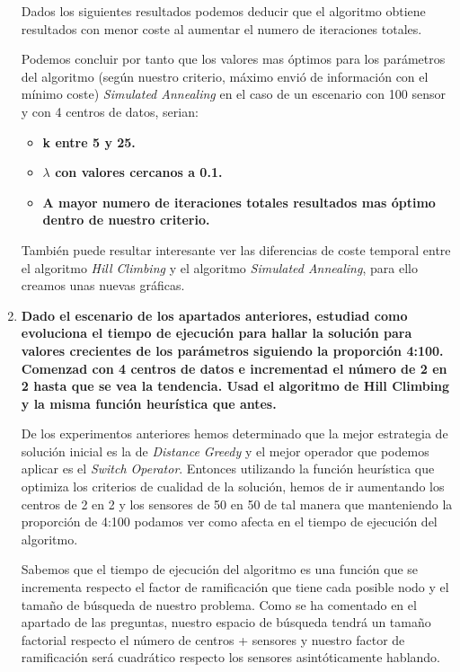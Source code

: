 \documentclass{article}
\begin{document}
\begin{enumerate}
 Dados los siguientes resultados podemos deducir que el algoritmo obtiene resultados con menor coste al aumentar el numero de iteraciones totales.

 Podemos concluir por tanto que los valores mas óptimos para los parámetros del algoritmo (según nuestro criterio, máximo envió de información con el mínimo coste) \textit{Simulated Annealing} en el caso de un escenario con 100 sensor y con 4 centros de datos, serian:

  \begin{itemize}
    \item \textbf{k entre 5 y 25.}
    \item \textbf{${\lambda}$ con valores cercanos a 0.1.}
    \item \textbf{A mayor numero de iteraciones totales resultados mas óptimo dentro de nuestro criterio.}
  \end{itemize}

  También puede resultar interesante ver las diferencias de coste temporal entre el algoritmo \textit{Hill Climbing} y el algoritmo  \textit{Simulated Annealing}, para ello creamos unas nuevas gráficas.


  \item \textbf{Dado el escenario de los apartados anteriores, estudiad como evoluciona el tiempo de ejecución para hallar la solución para valores crecientes de los parámetros siguiendo la proporción 4:100. Comenzad con 4 centros de datos e incrementad el número de 2 en 2 hasta que se vea la tendencia. Usad el algoritmo de Hill Climbing y la misma función heurística que antes.}

  De los experimentos anteriores hemos determinado que la mejor estrategia de solución inicial es la de \textit{Distance Greedy} y el mejor operador que podemos aplicar es el \textit{Switch Operator}. Entonces utilizando la función heurística que optimiza los criterios de cualidad de la solución, hemos de ir aumentando los centros de 2 en 2 y los sensores de 50 en 50 de tal manera que manteniendo la proporción de 4:100 podamos ver como afecta en el tiempo de ejecución del algoritmo.

  Sabemos que el tiempo de ejecución del algoritmo es una función que se incrementa respecto el factor de ramificación que tiene cada posible nodo y el tamaño de búsqueda de nuestro problema. Como se ha comentado en el apartado de las preguntas, nuestro espacio de búsqueda tendrá un tamaño factorial respecto el número de centros + sensores y nuestro factor de ramificación será cuadrático respecto los sensores asintóticamente hablando.


\end{enumerate}
\end{document}
